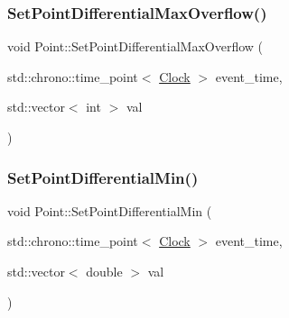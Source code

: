 \mbox{\label{classPoint_a0b1ce0db9514762fc3aa9d57fa3034a0}} 
\subsubsection{\texorpdfstring{Set\+Point\+Differential\+Max\+Overflow()}{SetPointDifferentialMaxOverflow()}}
{\footnotesize\ttfamily void Point\+::\+Set\+Point\+Differential\+Max\+Overflow (\begin{DoxyParamCaption}\item[{std\+::chrono\+::time\+\_\+point$<$ \mbox{\hyperlink{universe_8h_a0ef8d951d1ca5ab3cfaf7ab4c7a6fd80}{Clock}} $>$}]{event\+\_\+time,  }\item[{std\+::vector$<$ int $>$}]{val }\end{DoxyParamCaption})\hspace{0.3cm}{\ttfamily [inline]}}

\mbox{\label{classPoint_a944fcec52017ce88e052a576ef143926}} 
\subsubsection{\texorpdfstring{Set\+Point\+Differential\+Min()}{SetPointDifferentialMin()}}
{\footnotesize\ttfamily void Point\+::\+Set\+Point\+Differential\+Min (\begin{DoxyParamCaption}\item[{std\+::chrono\+::time\+\_\+point$<$ \mbox{\hyperlink{universe_8h_a0ef8d951d1ca5ab3cfaf7ab4c7a6fd80}{Clock}} $>$}]{event\+\_\+time,  }\item[{std\+::vector$<$ double $>$}]{val }\end{DoxyParamCaption})\hspace{0.3cm}{\ttfamily [inline]}}

\mbox{\label{classPoint_a582e63ebdbb0979234acb460e673a393}} 
